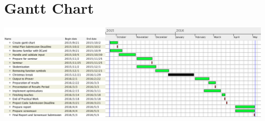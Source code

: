 \chapter{Gantt Chart} \label{ganttchart}
\begin{center}
\includegraphics[angle=90,origin=c,scale=0.69]{ganttchart.png}
\end{center}
